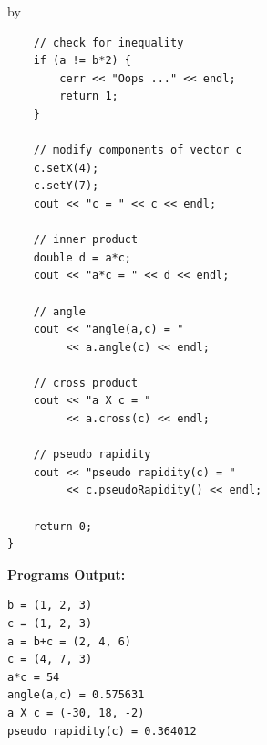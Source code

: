 \documentclass[twoside]{article}
\newcommand{\entrylabel}[1]{\mbox{\textbf{{#1}}}\hfil}%
\newenvironment{entry}
{\begin{list}{}%
    {\renewcommand{\makelabel}{\entrylabel}%
     \setlength{\labelwidth}{90pt}%
     \setlength{\leftmargin}{\labelwidth}
     \advance\leftmargin by \labelsep%
      }%
    }%
  {\end{list}}
\newcommand{\Entrylabel}[1]%
{\raisebox{0pt}[1ex][0pt]{\makebox[\labelwidth][l]%
    {\parbox[t]{\labelwidth}{\hspace{0pt}\textbf{{#1}}}}}}
\newenvironment{Entry}%
{\renewcommand{\entrylabel}{\Entrylabel}\begin{entry}}%
  {\end{entry}}
\begin{document}
\begin{Entry}
{\begin{verbatim}
    // check for inequality
    if (a != b*2) {
        cerr << "Oops ..." << endl;
        return 1;
    }

    // modify components of vector c
    c.setX(4);
    c.setY(7);
    cout << "c = " << c << endl;

    // inner product
    double d = a*c;
    cout << "a*c = " << d << endl;

    // angle
    cout << "angle(a,c) = "
         << a.angle(c) << endl;

    // cross product
    cout << "a X c = "
         << a.cross(c) << endl;
    
    // pseudo rapidity
    cout << "pseudo rapidity(c) = "
         << c.pseudoRapidity() << endl;
    
    return 0;
}
\end{verbatim}

{\bf Programs Output:}

\begin{verbatim}
b = (1, 2, 3)
c = (1, 2, 3)
a = b+c = (2, 4, 6)
c = (4, 7, 3)
a*c = 54
angle(a,c) = 0.575631
a X c = (-30, 18, -2)
pseudo rapidity(c) = 0.364012
\end{verbatim}
}
\end{Entry}

\clearpage

%
%
\end{document}
